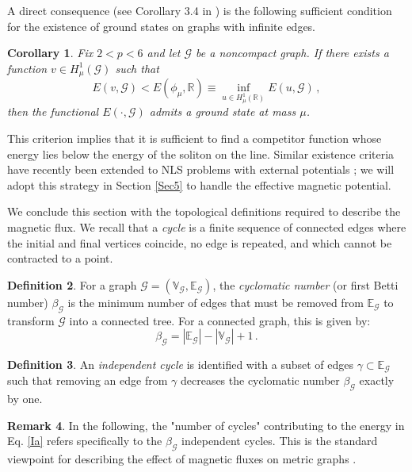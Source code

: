 \documentclass[12pt,a4paper]{amsart}
\theoremstyle{definition}
\newtheorem{definition}{Definition}[section]
\newtheorem{remark}[definition]{Remark}
\theoremstyle{plain}
\newtheorem{corollary}[definition]{Corollary}
\def \G {\mathcal{G}}
\numberwithin{equation}{section}
\begin{document}
A direct consequence (see Corollary 3.4 in \cite{Adami2016}) is the following sufficient condition for the existence of ground states on graphs with infinite edges.

\begin{corollary}
Fix $2 < p < 6$ and let $\mathcal{G}$ be a noncompact graph. If there exists a function $v \in H^1_{\mu}(\mathcal{G})$ such that
\begin{equation}
  E(v, \mathcal{G})  < E(\phi_{\mu}, \mathbb{R}) \equiv \inf_{u \in H^1_\mu(\mathbb{R})} E(u, \G)\,,
  \label{criterion1}
\end{equation}
then the functional $E(\cdot, \G)$ admits a ground state at mass $\mu$.
\end{corollary}

This criterion implies that it is sufficient to find a competitor function whose energy lies below the energy of the soliton on the line. Similar existence criteria have recently been extended to NLS problems with external potentials \cite{Adami2025}; we will adopt this strategy in Section \ref{Sec5} to handle the effective magnetic potential.

\bigskip

We conclude this section with the topological definitions required to describe the magnetic flux. We recall that a \emph{cycle} is a finite sequence of connected edges where the initial and final vertices coincide, no edge is repeated, and which cannot be contracted to a point.

\begin{definition}
    For a graph $\G = (\mathbb{V}_\G, \mathbb{E}_\G)$, the \emph{cyclomatic number} (or first Betti number) $\beta_{\G}$ is the minimum number of edges that must be removed from $\mathbb{E}_\G$ to transform $\G$ into a connected tree. For a connected graph, this is given by:
    \[
    \beta_{\G} = |\mathbb{E}_\G| - |\mathbb{V}_\G| +1 \,.
    \]
\end{definition}

\begin{definition}
    An \emph{independent cycle} is identified with a subset of edges $\gamma \subset \mathbb{E}_\G$ such that removing an edge from $\gamma$ decreases the cyclomatic number $\beta_\G$ exactly by one.
\end{definition}

\begin{remark}
In the following, the "number of cycles" contributing to the energy in Eq. \eqref{Ia} refers specifically to the $\beta_\G$ independent cycles. This is the standard viewpoint for describing the effect of magnetic fluxes on metric graphs \cite{Berkolaiko2013}.
\end{remark}
\end{document}
